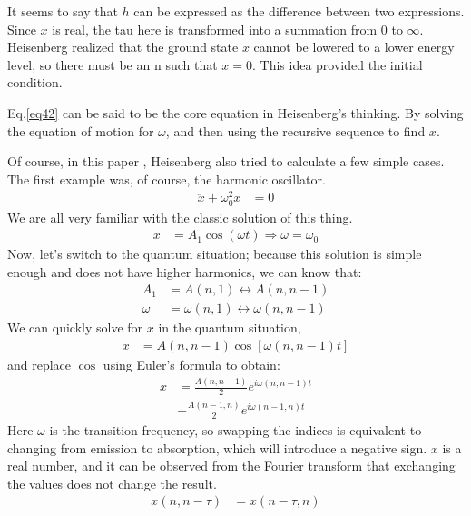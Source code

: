 \documentclass[a4paper, 12pt, oneside, onecolumn]{article}
\begin{document}
\begin{multicols}{2}
It seems to say that $h$ can be expressed as the difference between two expressions. Since $x$ is real, the tau here is transformed into a summation from $0$ to $\infty$. Heisenberg realized that the ground state $x$ cannot be lowered to a lower energy level, so there must be an n such that $x = 0$. This idea provided the initial condition.

Eq.\ref{eq42} can be said to be the core equation in Heisenberg's thinking. By solving the equation of motion for $\omega$, and then using the recursive sequence to find $x$.

Of course, in this paper \cite{Heisenberg1925}, Heisenberg also tried to calculate a few simple cases. The first example was, of course, the harmonic oscillator.
\begin{align}
	\ddot x + \omega_0^2 x
	&= 0
\end{align}
We are all very familiar with the classic solution of this thing.
\begin{align}
	x
	&= A_1 \cos \left( \omega t \right) \Rightarrow \omega = \omega_0
\end{align}
Now, let's switch to the quantum situation; because this solution is simple enough and does not have higher harmonics, we can know that:
\begin{align}
	A_1
	&= A \left( n, 1 \right) \longleftrightarrow A \left( n, n - 1 \right) \\
	\omega
	&= \omega \left( n, 1 \right) \longleftrightarrow \omega \left( n, n - 1 \right)
\end{align}
We can quickly solve for $x$ in the quantum situation,
\begin{align}
	x
	&= A \left( n, n - 1 \right) \cos \left[ \omega \left( n, n - 1  \right) t \right]
\end{align}
and replace $\cos$ using Euler's formula to obtain:
\begin{align}
	x
	&= \frac{A \left( n, n - 1 \right)}{2} e^{i \omega \left( n, n - 1 \right) t} \nonumber \\
	&+ \frac{A \left( n - 1, n \right)}{2} e^{i \omega \left( n - 1, n \right) t}
\end{align}
Here $\omega$ is the transition frequency, so swapping the indices is equivalent to changing from emission to absorption, which will introduce a negative sign. $x$ is a real number, and it can be observed from the Fourier transform that exchanging the values does not change the result.
\begin{align}
	x \left( n, n - \tau \right)
	&= x \left( n - \tau, n \right) \\

\end{align}
\end{multicols}
\end{document}
